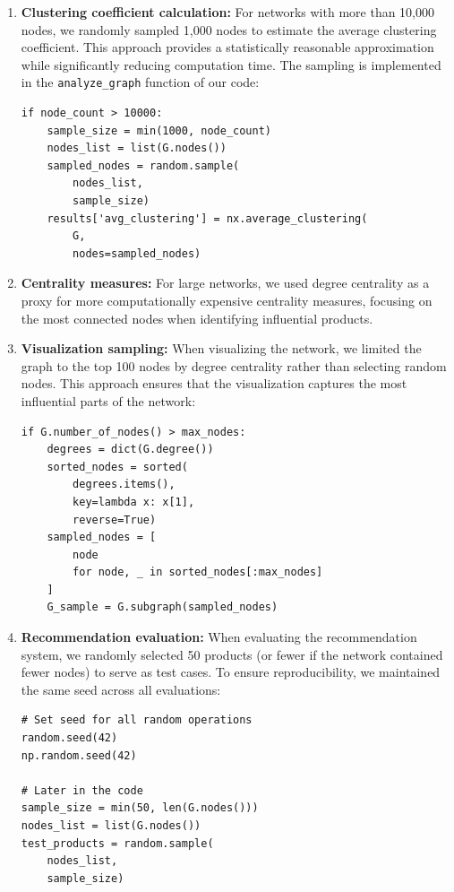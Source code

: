 \documentclass[conference]{IEEEtran}
\begin{document}
\begin{enumerate}
    \item \textbf{Clustering coefficient calculation:} For networks with more than 10,000 nodes, we randomly sampled 1,000 nodes to estimate the average clustering coefficient. This approach provides a statistically reasonable approximation while significantly reducing computation time. The sampling is implemented in the \texttt{analyze\_graph} function of our code:
    
    \begin{lstlisting}
if node_count > 10000:
    sample_size = min(1000, node_count)
    nodes_list = list(G.nodes())
    sampled_nodes = random.sample(
        nodes_list, 
        sample_size)
    results['avg_clustering'] = nx.average_clustering(
        G, 
        nodes=sampled_nodes)
    \end{lstlisting}
    
    \item \textbf{Centrality measures:} For large networks, we used degree centrality as a proxy for more computationally expensive centrality measures, focusing on the most connected nodes when identifying influential products.
    
    \item \textbf{Visualization sampling:} When visualizing the network, we limited the graph to the top 100 nodes by degree centrality rather than selecting random nodes. This approach ensures that the visualization captures the most influential parts of the network:
    
    \begin{lstlisting}
if G.number_of_nodes() > max_nodes:
    degrees = dict(G.degree())
    sorted_nodes = sorted(
        degrees.items(), 
        key=lambda x: x[1], 
        reverse=True)
    sampled_nodes = [
        node 
        for node, _ in sorted_nodes[:max_nodes]
    ]
    G_sample = G.subgraph(sampled_nodes)
    \end{lstlisting}
    
    \item \textbf{Recommendation evaluation:} When evaluating the recommendation system, we randomly selected 50 products (or fewer if the network contained fewer nodes) to serve as test cases. To ensure reproducibility, we maintained the same seed across all evaluations:
    
    \begin{lstlisting}
# Set seed for all random operations
random.seed(42)
np.random.seed(42)

# Later in the code
sample_size = min(50, len(G.nodes()))
nodes_list = list(G.nodes())
test_products = random.sample(
    nodes_list, 
    sample_size)
    \end{lstlisting}
\end{enumerate}
\end{document}
